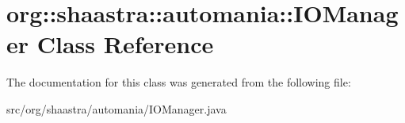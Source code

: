 \hypertarget{classorg_1_1shaastra_1_1automania_1_1IOManager}{
\section{\-o\-r\-g\-:\-:\-s\-h\-a\-a\-s\-t\-r\-a\-:\-:\-a\-u\-t\-o\-m\-a\-n\-i\-a\-:\-:\-I\-O\-M\-a\-n\-a\-g\-e\-r \-C\-l\-a\-s\-s \-R\-e\-f\-e\-r\-e\-n\-c\-e}
\label{classorg_1_1shaastra_1_1automania_1_1IOManager}
}


The documentation for this class was generated from the following file:\begin{DoxyCompactItemize}
\item 
\-s\-r\-c\-/\-o\-r\-g\-/\-s\-h\-a\-a\-s\-t\-r\-a\-/\-a\-u\-t\-o\-m\-a\-n\-i\-a\-/\-I\-O\-M\-a\-n\-a\-g\-e\-r\-.\-j\-a\-v\-a\end{DoxyCompactItemize}

